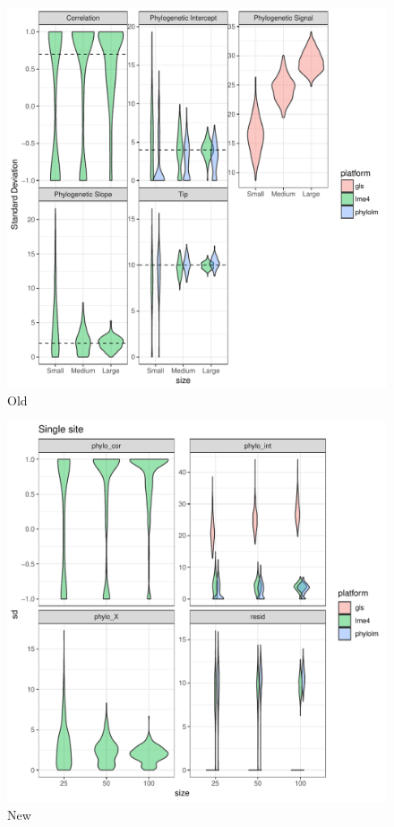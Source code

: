 \begin{center}
\begin{figure}[h]
  \includegraphics[scale=0.8,page=1]{./git_push/ssplot.pdf}
  \caption{Old}
\end{figure}
\end{center}

\begin{center}
\begin{figure}[h]
  \includegraphics[scale=0.8,page=1]{./git_push/plot.pdf}
  \caption{New}
\label{ssplot}
\end{figure}
\end{center}


